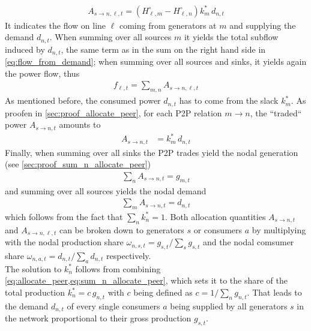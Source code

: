\documentclass[11pt,twocolumn]{article}
\newcommand{\generation}{g_{s,t}}
\newcommand{\generationshare}[1][n]{\omega_{#1,s,t}}
\newcommand{\nodalgeneration}[1][n]{g_{#1,t}}
\newcommand{\demand}[1][n]{d_{#1,t}}
\newcommand{\nodaldemand}[1][n]{d_{#1,t}}
\newcommand{\demandshare}[1][n]{\omega_{#1,a,t}}
\newcommand{\ptdf}[1][n]{H_{\ell,#1}}
\newcommand{\ptdfEqual}[1][n]{\ptdf[#1]^\circ}
\newcommand{\slackk}[1][n]{k^*_{#1}}
\newcommand{\flow}{f_{\ell,t}}
\newcommand{\allocatePeer}[1][s \rightarrow n]{A_{#1,t}}
\newcommand{\allocateTransaction}[1][s \rightarrow n]{A_{#1,\ell,t}}
\begin{document}
\begin{align}
\allocateTransaction = \left(  \ptdfEqual[m] - \ptdfEqual \right) \slackk[m] \, \nodaldemand
\label{eq:allocate_transaction}
\end{align}
% 
It indicates the flow on line $\ell$ coming from generators at $m$ and supplying the demand $\nodaldemand$. When summing over all sources $m$ it yields the total subflow induced by $\nodaldemand$, the same term as in the sum on the right hand side in \cref{eq:flow_from_demand}; 
when summing over all sources and sinks, it yields again the power flow, thus
\begin{align}
\flow = \sum_{m,n} \allocateTransaction
\label{eq:transaction_sum}
\end{align}
% 
As mentioned before, the consumed power $\nodaldemand$ has to come from the slack $\slackk[m]$. As proofen in \cref{sec:proof_allocate_peer}, for each P2P relation $m \rightarrow n$, the ``traded`` power $\allocatePeer$  amounts to
\begin{align}
\allocatePeer &= \slackk[m] \, \nodaldemand 
\label{eq:allocate_peer}
\end{align}
% 
Finally, when summing over all sinks the P2P trades yield the nodal generation (see \cref{sec:proof_sum_n_allocate_peer}) 
\begin{align}
\sum_n \allocatePeer = \nodalgeneration[m]
\label{eq:sum_n_allocate_peer}
\end{align}
and summing over all sources yields the nodal demand 
\begin{align}
\sum_m \allocatePeer = \nodaldemand
\label{eq:sum_m_allocate_peer}
\end{align}
which follows from the fact that $\sum_n \slackk = 1$.
Both allocation quantities $\allocatePeer$ and $\allocateTransaction$ can be broken down to generators $s$ or consumers $a$ by multiplying with the nodal production share $\generationshare = \generation/\sum_s \generation$ and the nodal comsumer share $\demandshare = \demand/\sum_a \demand$ respectively. \\

The solution to $\slackk$ follows from combining \cref{eq:allocate_peer,eq:sum_n_allocate_peer}, which sets it to the share of the total production $\slackk = c \, \nodalgeneration$ with $c$ being defined as $c = 1/\sum_n \nodalgeneration$. That leads to the demand $\demand$ of every single consumers $a$ being supplied by all generators $s$ in the network proportional to their gross production $\generation$. 
\end{document}
